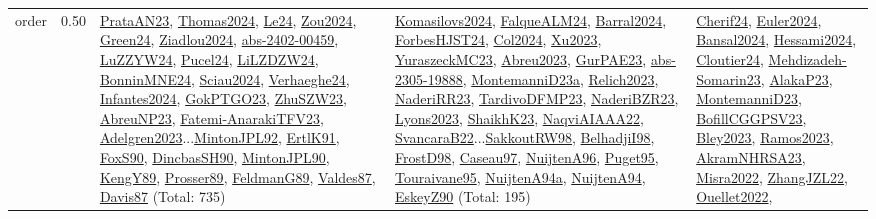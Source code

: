 {\begin{longtable}{p{3cm}r>{\raggedright\arraybackslash}p{6cm}>{\raggedright\arraybackslash}p{6cm}>{\raggedright\arraybackslash}p{8cm}}
\index{order}\index{Scheduling!order}order &  0.50 & \hyperref[detail:PrataAN23]{PrataAN23}, \hyperref[detail:Thomas2024]{Thomas2024}, \hyperref[detail:Le24]{Le24}, \hyperref[detail:Zou2024]{Zou2024}, \hyperref[detail:Green24]{Green24}, \hyperref[detail:Ziadlou2024]{Ziadlou2024}, \hyperref[detail:abs-2402-00459]{abs-2402-00459}, \hyperref[detail:LuZZYW24]{LuZZYW24}, \hyperref[detail:Pucel24]{Pucel24}, \hyperref[detail:LiLZDZW24]{LiLZDZW24}, \hyperref[detail:BonninMNE24]{BonninMNE24}, \hyperref[detail:Sciau2024]{Sciau2024}, \hyperref[detail:Verhaeghe24]{Verhaeghe24}, \hyperref[detail:Infantes2024]{Infantes2024}, \hyperref[detail:GokPTGO23]{GokPTGO23}, \hyperref[detail:ZhuSZW23]{ZhuSZW23}, \hyperref[detail:AbreuNP23]{AbreuNP23}, \hyperref[detail:Fatemi-AnarakiTFV23]{Fatemi-AnarakiTFV23}, \hyperref[detail:Adelgren2023]{Adelgren2023}...\hyperref[detail:MintonJPL92]{MintonJPL92}, \hyperref[detail:ErtlK91]{ErtlK91}, \hyperref[detail:FoxS90]{FoxS90}, \hyperref[detail:DincbasSH90]{DincbasSH90}, \hyperref[detail:MintonJPL90]{MintonJPL90}, \hyperref[detail:KengY89]{KengY89}, \hyperref[detail:Prosser89]{Prosser89}, \hyperref[detail:FeldmanG89]{FeldmanG89}, \hyperref[detail:Valdes87]{Valdes87}, \hyperref[detail:Davis87]{Davis87} (Total: 735) & \hyperref[detail:Komasilovs2024]{Komasilovs2024}, \hyperref[detail:FalqueALM24]{FalqueALM24}, \hyperref[detail:Barral2024]{Barral2024}, \hyperref[detail:ForbesHJST24]{ForbesHJST24}, \hyperref[detail:Col2024]{Col2024}, \hyperref[detail:Xu2023]{Xu2023}, \hyperref[detail:YuraszeckMC23]{YuraszeckMC23}, \hyperref[detail:Abreu2023]{Abreu2023}, \hyperref[detail:GurPAE23]{GurPAE23}, \hyperref[detail:abs-2305-19888]{abs-2305-19888}, \hyperref[detail:MontemanniD23a]{MontemanniD23a}, \hyperref[detail:Relich2023]{Relich2023}, \hyperref[detail:NaderiRR23]{NaderiRR23}, \hyperref[detail:TardivoDFMP23]{TardivoDFMP23}, \hyperref[detail:NaderiBZR23]{NaderiBZR23}, \hyperref[detail:Lyons2023]{Lyons2023}, \hyperref[detail:ShaikhK23]{ShaikhK23}, \hyperref[detail:NaqviAIAAA22]{NaqviAIAAA22}, \hyperref[detail:SvancaraB22]{SvancaraB22}...\hyperref[detail:SakkoutRW98]{SakkoutRW98}, \hyperref[detail:BelhadjiI98]{BelhadjiI98}, \hyperref[detail:FrostD98]{FrostD98}, \hyperref[detail:Caseau97]{Caseau97}, \hyperref[detail:NuijtenA96]{NuijtenA96}, \hyperref[detail:Puget95]{Puget95}, \hyperref[detail:Touraivane95]{Touraivane95}, \hyperref[detail:NuijtenA94a]{NuijtenA94a}, \hyperref[detail:NuijtenA94]{NuijtenA94}, \hyperref[detail:EskeyZ90]{EskeyZ90} (Total: 195) & \hyperref[detail:Cherif24]{Cherif24}, \hyperref[detail:Euler2024]{Euler2024}, \hyperref[detail:Bansal2024]{Bansal2024}, \hyperref[detail:Hessami2024]{Hessami2024}, \hyperref[detail:Cloutier24]{Cloutier24}, \hyperref[detail:Mehdizadeh-Somarin23]{Mehdizadeh-Somarin23}, \hyperref[detail:AlakaP23]{AlakaP23}, \hyperref[detail:MontemanniD23]{MontemanniD23}, \hyperref[detail:BofillCGGPSV23]{BofillCGGPSV23}, \hyperref[detail:Bley2023]{Bley2023}, \hyperref[detail:Ramos2023]{Ramos2023}, \hyperref[detail:AkramNHRSA23]{AkramNHRSA23}, \hyperref[detail:Misra2022]{Misra2022}, \hyperref[detail:ZhangJZL22]{ZhangJZL22}, \hyperref[detail:Ouellet2022]{Ouellet2022}, 
\end{longtable}}
